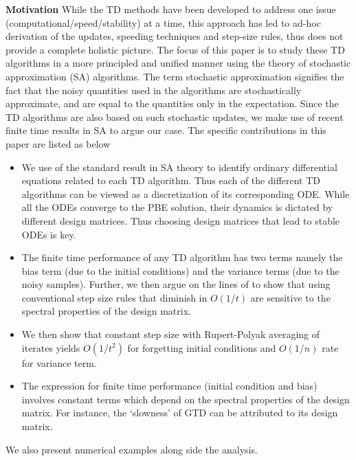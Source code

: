 \begin{comment}
Another related and important aspect of concern is the speed of convergence. A typical step-size rule is to choose them to diminish at a rate of $O(1/t)$ with respect to time. However, such step-sizes might be problem sensitive and can lead to poor speed of convergence. One remedy in the literature was to use the idea of speeding TD learning was used in speedy Q-learning (SQL) \cite{sql}. \cite{} uses adaptive step sizes based on the TD error to achieve faster learning rates. Recent RL algorithms such as GTD-MP claim to make use of ideas of accelerated gradient descent to achieve increase speed of convergence.\par
\end{comment}
\textbf{Motivation} While the TD methods have been developed to address one issue (computational/speed/stability) at a time, this approach has led to ad-hoc derivation of the updates, speeding techniques and step-size rules, thus does not provide a complete holistic picture. The focus of this paper is to study these TD algorithms in a more principled and unified manner using the theory of stochastic approximation (SA) algorithms. The term stochastic approximation signifies the fact that the noisy quantities used in the algorithms are stochastically approximate, and are equal to the quantities only in the expectation. Since the TD algorithms are also based on such stochastic updates, we make use of recent finite time results in SA \cite{} to argue our case. The specific contributions in this paper are listed as below
\begin{itemize}[leftmargin=*] 
\item We use of the standard result in SA theory to identify ordinary differential equations related to each TD algorithm. Thus each of the different TD algorithms can be viewed as a discretization of its corresponding ODE. While all the ODEs converge to the PBE solution, their dynamics is dictated by different design matrices. Thus choosing design matrices that lead to stable ODEs is key.
\item The finite time performance of any TD algorithm has two terms namely the bias term (due to the initial conditions) and the variance terms (due to the noisy samples). Further, we then argue on the lines of \cite{} to show that using conventional step size rules that diminish in $O(1/t)$ are sensitive to the spectral properties of the design matrix.
\item We then show that constant step size with Rupert-Polyak averaging of iterates yields $O(1/t^2)$ for forgetting initial conditions and $O(1/n)$ rate for variance term.
\item The expression for finite time performance (initial condition and bias) involves constant terms which depend on the spectral properties of the design matrix. For instance, the `slowness’ of GTD can be attributed to its design matrix.
\end{itemize}
We also present numerical examples along side the analysis.
